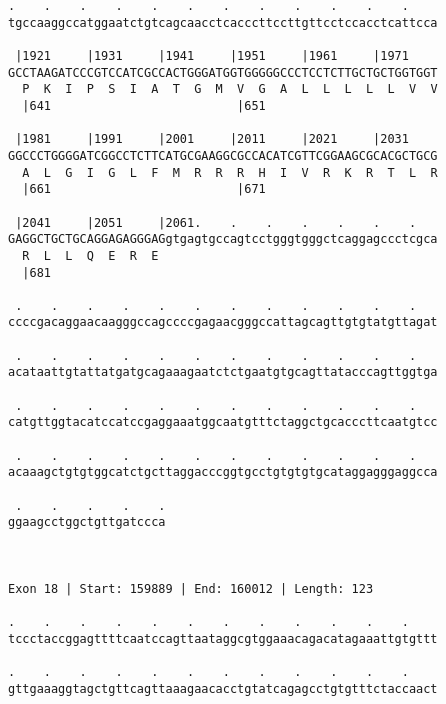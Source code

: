 \documentclass{article}
\begin{document}
\begin{Verbatim}
.    .    .    .    .    .    .    .    .    .    .    .    
tgccaaggccatggaatctgtcagcaacctcacccttccttgttcctccacctcattcca
                                                            
 |1921     |1931     |1941     |1951     |1961     |1971    
GCCTAAGATCCCGTCCATCGCCACTGGGATGGTGGGGGCCCTCCTCTTGCTGCTGGTGGT
  P  K  I  P  S  I  A  T  G  M  V  G  A  L  L  L  L  L  V  V
  |641                          |651                        
  
 |1981     |1991     |2001     |2011     |2021     |2031    
GGCCCTGGGGATCGGCCTCTTCATGCGAAGGCGCCACATCGTTCGGAAGCGCACGCTGCG
  A  L  G  I  G  L  F  M  R  R  R  H  I  V  R  K  R  T  L  R
  |661                          |671                        
  
 |2041     |2051     |2061.    .    .    .    .    .    .   
GAGGCTGCTGCAGGAGAGGGAGgtgagtgccagtcctgggtgggctcaggagccctcgca
  R  L  L  Q  E  R  E                                       
  |681                                                      
  
 .    .    .    .    .    .    .    .    .    .    .    .   
ccccgacaggaacaagggccagccccgagaacgggccattagcagttgtgtatgttagat
                                                            
 .    .    .    .    .    .    .    .    .    .    .    .   
acataattgtattatgatgcagaaagaatctctgaatgtgcagttatacccagttggtga
                                                            
 .    .    .    .    .    .    .    .    .    .    .    .   
catgttggtacatccatccgaggaaatggcaatgtttctaggctgcacccttcaatgtcc
                                                            
 .    .    .    .    .    .    .    .    .    .    .    .   
acaaagctgtgtggcatctgcttaggacccggtgcctgtgtgtgcataggagggaggcca
                                                            
 .    .    .    .    .
ggaagcctggctgttgatccca
                      
                      
 
Exon 18 | Start: 159889 | End: 160012 | Length: 123
 
.    .    .    .    .    .    .    .    .    .    .    .    
tccctaccggagttttcaatccagttaataggcgtggaaacagacatagaaattgtgttt
                                                            
.    .    .    .    .    .    .    .    .    .    .    .    
gttgaaaggtagctgttcagttaaagaacacctgtatcagagcctgtgtttctaccaact
                                                            

\end{Verbatim}
\end{document}
